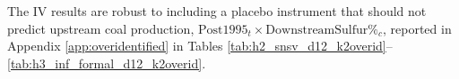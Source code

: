 \documentclass[12pt]{article}
\begin{document}
The IV results are robust to including a placebo instrument that should not predict upstream coal production, $\text{Post1995}_t \times \text{DownstreamSulfur\%}_c$, reported in Appendix \ref{app:overidentified} in Tables \ref{tab:h2_snsv_d12_k2overid}--\ref{tab:h3_inf_formal_d12_k2overid}.




\end{document}
